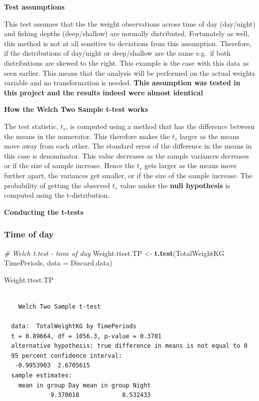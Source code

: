 \documentclass[
]{book}
\newenvironment{Shaded}{\begin{snugshade}}{\end{snugshade}}
\newcommand{\CommentTok}[1]{\textcolor[rgb]{0.56,0.35,0.01}{\textit{#1}}}
\newcommand{\DataTypeTok}[1]{\textcolor[rgb]{0.13,0.29,0.53}{#1}}
\newcommand{\KeywordTok}[1]{\textcolor[rgb]{0.13,0.29,0.53}{\textbf{#1}}}
\newcommand{\NormalTok}[1]{#1}
\newcommand{\OperatorTok}[1]{\textcolor[rgb]{0.81,0.36,0.00}{\textbf{#1}}}
\newcommand{\StringTok}[1]{\textcolor[rgb]{0.31,0.60,0.02}{#1}}
\begin{document}
\textbf{Test assumptions}

This test assumes that the the weight observations across time of day (day/night) and fishing depths (deep/shallow) are normally distributed. Fortunately as well, this method is not at all sensitive to deviations from this assumption. Therefore, if the distributions of day/night or deep/shallow are the same e.g.~if both distributions are skewed to the right. This example is the case with this data as seen earlier. This means that the analysis will be performed on the actual weights variable and no transformation is needed. \textbf{This assumption was tested in this project and the results indeed were almost identical}

\textbf{How the Welch Two Sample t-test works}

The test statistic, \(t_s\), is computed using a method that has the difference between the means in the numerator. This therefore makes the \(t_s\) larger as the means move away from each other. The standard error of the difference in the means in this case is denominator. This value decreases as the sample variances decreases or if the size of sample increase. Hence the \(t_s\) gets larger as the means move further apart, the variances get smaller, or if the size of the sample increase. The probability of getting the observed \(t_s\) value under the \textbf{null hypothesis} is computed using the t-distribution.

\textbf{Conducting the t-tests}

\hypertarget{time-of-day-1}{%
\subsubsection{Time of day}\label{time-of-day-1}}

\begin{Shaded}
\begin{Highlighting}[]
\CommentTok{# Welch t.test - time of day}
\NormalTok{Weight.ttest.TP <-}\StringTok{ }\KeywordTok{t.test}\NormalTok{(TotalWeightKG }\OperatorTok{~}\StringTok{ }\NormalTok{TimePeriods,}
  \DataTypeTok{data =}\NormalTok{ Discard.data)}

\NormalTok{Weight.ttest.TP}
\end{Highlighting}
\end{Shaded}

\begin{verbatim}
  
    Welch Two Sample t-test
  
  data:  TotalWeightKG by TimePeriods
  t = 0.89664, df = 1056.3, p-value = 0.3701
  alternative hypothesis: true difference in means is not equal to 0
  95 percent confidence interval:
   -0.9953903  2.6705615
  sample estimates:
    mean in group Day mean in group Night 
             9.370018            8.532433
\end{verbatim}
\end{document}
